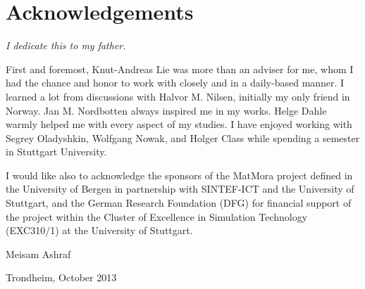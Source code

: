 \chapter{Acknowledgements}

\textit{\small{I dedicate this to my father.}} 

\vspace{1cm}

First and foremost, Knut-Andreas Lie was more than an adviser for me, whom I had
the chance and honor to work with closely and in a daily-based manner. I learned
a lot from discussions with Halvor M. Nilsen, initially my only friend in
Norway. Jan M. Nordbotten always inspired me in my works. Helge Dahle warmly helped me with every aspect of my studies. I have enjoyed working with Segrey Oladyshkin, Wolfgang Nowak, and Holger Class while spending a semester in Stuttgart University.

I would like also to acknowledge the sponsors of the MatMora project defined in the University of Bergen in partnership with SINTEF-ICT and the University of Stuttgart, and the German Research Foundation (DFG) for financial support of the project within the Cluster of Excellence in Simulation Technology (EXC310/1) at the University of Stuttgart.


\vspace{2cm}
\hspace{10.72cm}
Meisam Ashraf

\hspace{10cm}
Trondheim, October 2013 








